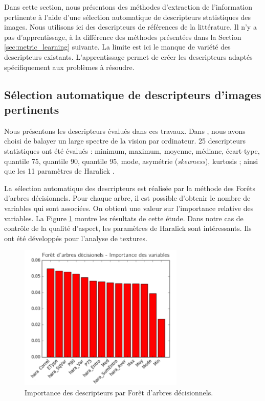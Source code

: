 Dans cette section, nous présentons des méthodes d'extraction de l'information pertinente à l'aide d'une sélection automatique de descripteurs statistiques des images.
Nous utilisons ici des descripteurs de références de la littérature.
Il n'y a pas d'apprentissage, à la différence des méthodes présentées dans la Section \ref{sec:metric_learning} suivante.
La limite est ici le manque de variété des descripteurs existants.
L'apprentissage permet de créer les descripteurs adaptés spécifiquement aux problèmes à résoudre.

\subsection{Sélection automatique de descripteurs d'images pertinents}
Nous présentons les descripteurs évalués dans ces travaux.
Dans \cite{nagorny_quality_2017}, nous avons choisi de balayer un large spectre de la vision par ordinateur.
25 descripteurs statistiques ont été évalués : minimum, maximum, moyenne, médiane, écart-type, quantile 75, quantile 90, quantile 95, mode, asymétrie (\textit{skewness}), kurtosis ; ainsi que les 11 paramètres de Haralick \cite{haralick_textural_1973}.

La sélection automatique des descripteurs est réalisée par la méthode des Forêts d'arbres décisionnels.
Pour chaque arbre, il est possible d'obtenir le nombre de variables qui sont associées.
On obtient une valeur sur l'importance relative des variables.
La Figure \ref{fig:random_forest} montre les résultats de cette étude.
Dans notre cas de contrôle de la qualité d'aspect, les paramètres de Haralick sont intéressants.
Ils ont été développés pour l'analyse de textures.

\begin{figure}[hbtp]
    \centering
    \includegraphics[width=0.7\textwidth,height=\textheight,keepaspectratio]{../Chap3/Figures/random_forest_importance.png}
    \caption{Importance des descripteurs par Forêt d'arbres décisionnels.}
    \label{fig:random_forest}
\end{figure}

